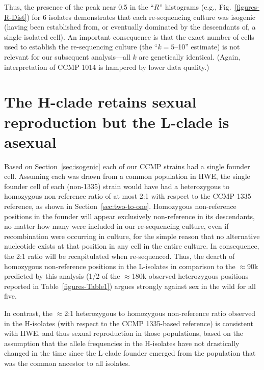 \documentclass{article}\usepackage[]{graphicx}\usepackage[]{color}
\begin{document}
Thus, the presence of the peak near 0.5 in the ``$R$'' histograms (e.g., Fig.~\ref{figures-R-Dist}) for 6 isolates demonstrates that each re-sequencing culture was isogenic (having been established from, or eventually dominated by the descendants of, a single isolated cell).  An important consequence is that the exact number of cells used to establish the re-sequencing culture (the ``$k=5$--10'' estimate) is not relevant for our subsequent analysis---all $k$ are genetically identical.  (Again, interpretation of CCMP 1014 is hampered by lower data quality.)

\section{The H-clade retains sexual reproduction but the L-clade is asexual}

Based on Section~\ref{sec:isogenic} each of our CCMP strains had a single founder cell.  Assuming each was drawn from a common population in HWE, the single founder cell of each (non-1335) strain would have had a heterozygous to homozygous non-reference ratio of at most 2:1 with respect to the CCMP 1335 reference, as shown in Section~\ref{sec:two-to-one}.  Homozygous non-reference positions in the founder will appear exclusively non-reference in its descendants, no matter how many were included in our re-sequencing culture, even if recombination were occurring in culture, for the simple reason that no alternative nucleotide exists at that position in any cell in the entire culture.  In consequence, the 2:1 ratio will be recapitulated when re-sequenced.
Thus, the dearth of homozygous non-reference positions in the L-isolates in comparison to the 
$\approx$90k predicted by this analysis (1/2 of the $\approx$180k observed heterozygous positions
reported in Table~\ref{figures-Table1}) argues strongly against sex in the wild for all five.

In contrast, the $\approx$2:1 heterozygous to homozygous non-reference ratio observed in the H-isolates (with
respect to the CCMP 1335-based reference) is consistent with HWE, and
thus sexual reproduction in those populations, based on the assumption
that the allele frequencies in the H-isolates have not drastically
changed in the time since the L-clade founder emerged from the
population that was the common ancestor to all isolates.
\end{document}
